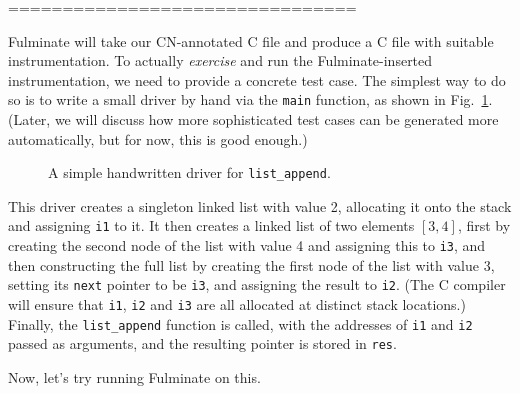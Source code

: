 ================================

Fulminate will take our CN-annotated C file and produce a C file with suitable instrumentation. To actually \emph{exercise} and run the Fulminate-inserted instrumentation, we need to provide a concrete test case. The simplest way to do so is to write a small driver by hand via the \texttt{main} function, as shown in Fig.~\ref{fig:list_append_driver}. (Later, we will discuss how more sophisticated test cases can be generated more automatically, but for now, this is good enough.)

\begin{figure}[h!]
    \begin{center}
    
    \vspace{-1em}
    \end{center}
    \label{fig:list_append_driver}
    \caption{A simple handwritten driver for \texttt{list\_append}.}
\end{figure}

This driver creates a singleton linked list with value 2, allocating it onto the stack and assigning \texttt{i1} to it. It then creates a linked list of two elements $[3, 4]$, first by creating the second node of the list with value 4 and assigning this to \texttt{i3}, and then constructing the full list by creating the first node of the list with value 3, setting its \texttt{next} pointer to be \texttt{i3}, and assigning the result to \texttt{i2}. (The C compiler will ensure that \texttt{i1}, \texttt{i2} and \texttt{i3} are all allocated at distinct stack locations.) Finally, the \texttt{list\_append} function is called, with the addresses of \texttt{i1} and \texttt{i2} passed as arguments, and the resulting pointer is stored in \texttt{res}.

Now, let's try running Fulminate on this.

\begin{figure}[h!]
    \begin{center}
    
    \vspace{-1em}
    \end{center}
    \label{fig:append_fulm_error_msg}
\end{figure}



